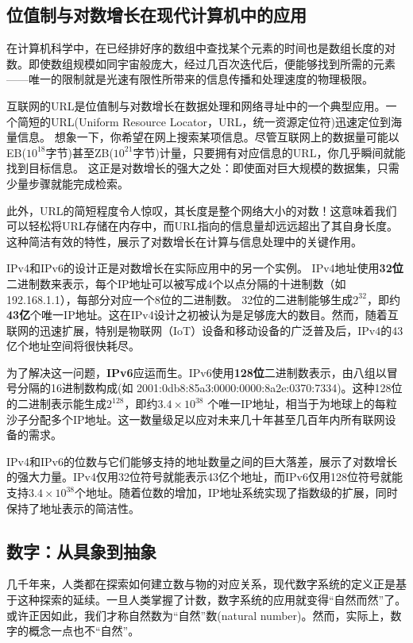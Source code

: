 \subsection{位值制与对数增长在现代计算机中的应用}
在计算机科学中，在已经排好序的数组中查找某个元素的时间也是数组长度的对数。即使数组规模如同宇宙般庞大，经过几百次迭代后，便能够找到所需的元素——唯一的限制就是光速有限性所带来的信息传播和处理速度的物理极限。

互联网的URL是位值制与对数增长在数据处理和网络寻址中的一个典型应用。一个简短的URL(Uniform Resource Locator，URL，统一资源定位符)迅速定位到海量信息。
想象一下，你希望在网上搜索某项信息。尽管互联网上的数据量可能以EB($10^{18}$字节)甚至ZB($10^{21}$字节)计量，只要拥有对应信息的URL，你几乎瞬间就能找到目标信息。
这正是对数增长的强大之处：即使面对巨大规模的数据集，只需少量步骤就能完成检索。

此外，URL的简短程度令人惊叹，其长度是整个网络大小的对数！这意味着我们可以轻松将URL存储在内存中，而URL指向的信息量却远远超出了其自身长度。
这种简洁有效的特性，展示了对数增长在计算与信息处理中的关键作用。

IPv4和IPv6的设计正是对数增长在实际应用中的另一个实例。
 IPv4地址使用{\bf 32位}二进制数来表示，每个IP地址可以被写成4个以点分隔的十进制数（如192.168.1.1），每部分对应一个8位的二进制数。
32位的二进制能够生成$2^{32}$，即约{\bf 43亿}个唯一IP地址。这在IPv4设计之初被认为是足够庞大的数目。然而，随着互联网的迅速扩展，特别是物联网（IoT）设备和移动设备的广泛普及后，IPv4的43亿个地址空间将很快耗尽。

   为了解决这一问题，{\bf IPv6}应运而生。IPv6使用{\bf 128位}二进制数表示，由八组以冒号分隔的16进制数构成(如 2001:0db8:85a3:0000:0000:8a2e:0370:7334)。这种128位的二进制表示能生成$2^{128}$，即约{\bf $3.4 \times 10^{38} $} 个唯一IP地址，相当于为地球上的每粒沙子分配多个IP地址。这一数量级足以应对未来几十年甚至几百年内所有联网设备的需求。
   
IPv4和IPv6的位数与它们能够支持的地址数量之间的巨大落差，展示了对数增长的强大力量。IPv4仅用32位符号就能表示43亿个地址，而IPv6仅用128位符号就能支持{\bf $3.4 \times 10^{38}$}个地址。随着位数的增加，IP地址系统实现了指数级的扩展，同时保持了地址表示的简洁性。


\subsection{数字：从具象到抽象}
几千年来，人类都在探索如何建立数与物的对应关系，现代数字系统的定义正是基于这种探索的延续。一旦人类掌握了计数，数字系统的应用就变得“自然而然”了。或许正因如此，我们才称自然数为“自然”数(natural number)。然而，实际上，数字的概念一点也不“自然”。

